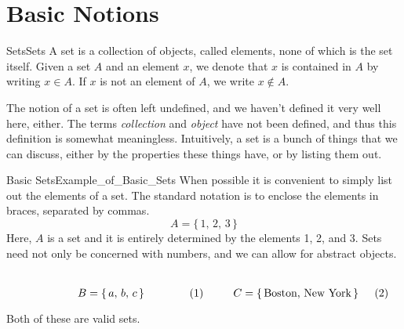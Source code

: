 \section{Basic Notions}
    \begin{ldefinition}{Sets}{Sets}
        A \gls{set} is a collection of objects, called elements, none of which
        is the set itself. Given a set $A$ and an element $x$, we denote that
        $x$ is contained in $A$ by writing $x\in{A}$. If $x$ is not an
        element of $A$, we write $x\notin{A}$.
    \end{ldefinition}
    The notion of a \textrm{set} is often left undefined, and we haven't
    defined it very well here, either. The terms \textit{collection} and
    \textit{object} have not been defined, and thus this definition is
    somewhat meaningless. Intuitively, a set is a bunch of things that we can
    discuss, either by the properties these things have, or by listing them
    out.
    \begin{lexample}{Basic Sets}{Example_of_Basic_Sets}
        When possible it is convenient to simply list out the elements of a
        set. The standard notation is to enclose the elements in braces,
        separated by commas.
        \begin{equation}
            A=\{\,1,\,2,\,3\,\}
        \end{equation}
        Here, $A$ is a set and it is entirely determined by the elements 1, 2,
        and 3. Sets need not only be concerned with numbers, and we can allow
        for abstract objects.
        \par
        \begin{subequations}
            \begin{minipage}[b]{0.49\textwidth}
                \centering
                \begin{equation}
                    B=\{\,a,\,b,\,c\,\}
                \end{equation}
            \end{minipage}
            \hfill
            \begin{minipage}[b]{0.49\textwidth}
                \centering
                \begin{equation}
                    C=\{\,\textrm{Boston, New York}\,\}
                \end{equation}
            \end{minipage}
        \end{subequations}
        \par\vspace{2.5ex}
        Both of these are valid sets.
    \end{lexample}
